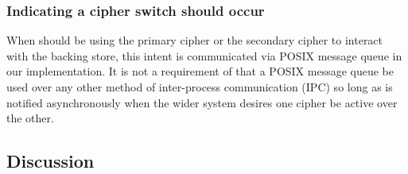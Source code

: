 \subsubsection{Indicating a cipher switch should occur}

When \SYSTEM{} should be using the primary cipher or the secondary cipher to
interact with the backing store, this intent is communicated via POSIX message
queue in our implementation. It is not a requirement of \SYSTEM{} that a POSIX
message queue be used over any other method of inter-process communication (IPC)
so long as \SYSTEM{} is notified asynchronously when the wider system desires
one cipher be active over the other.

\subsection{Discussion}



